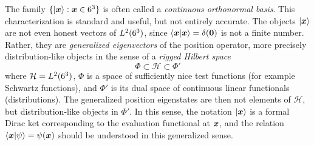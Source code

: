 \begin{digression}
The family \(\{\ket{{\boldsymbol{x}}}:{\boldsymbol{x}}\in6^3\}\) is often called a \emph{continuous orthonormal basis}.
This characterization is standard and useful, but not entirely accurate.
The objects \(\ket{{\boldsymbol{x}}}\) are not even honest vectors of \(L^2(6^3)\), since
\(
\braket{{\boldsymbol{x}}|{\boldsymbol{x}}}
=
\delta({\boldsymbol{0}})
\)
is not a finite number.
Rather, they are \emph{generalized eigenvectors} of the position operator, more precisely distribution-like objects in the sense of a \emph{rigged Hilbert space}
\cite{deLaMadridRiggedHilbertSpace}
\[
\Phi \subset \mathcal H \subset \Phi'
\]
where \(\mathcal H = L^2(6^3)\), \(\Phi\) is a space of sufficiently nice test functions (for example Schwartz functions), and \(\Phi'\) is its dual space of continuous linear functionals (distributions).
The generalized position eigenstates are then not elements of \(\mathcal H\), but distribution-like objects in \(\Phi'\).
In this sense, the notation \(\ket{{\boldsymbol{x}}}\) is a formal Dirac ket corresponding to the evaluation functional at \({\boldsymbol{x}}\), and the relation
\(
\braket{{\boldsymbol{x}}|\psi} = \psi({\boldsymbol{x}})
\)
should be understood in this generalized sense.

\medskip


\end{digression}
